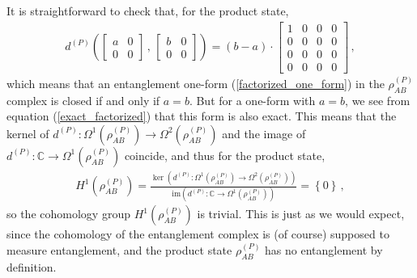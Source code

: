 \documentclass[12pt]{article}
\numberwithin{equation}{section}
\begin{document}
It is straightforward to check that, for the product state,
%
\begin{align}
    d^{(P)} \left( \begin{bmatrix} a & 0 \\ 0 & 0 \end{bmatrix} \, , \,  \begin{bmatrix} b & 0 \\ 0 & 0 \end{bmatrix} \right) = \left( b - a \right) \cdot \begin{bmatrix} 1 & 0 & 0 & 0 \\ 0 & 0 & 0 & 0 \\ 0 & 0 & 0 & 0 \\ 0 & 0 & 0 & 0 \end{bmatrix} \, ,
\end{align}
%
which means that an entanglement one-form (\ref{factorized_one_form}) in the $\rho^{(P)}_{AB}$ complex is closed if and only if $a = b$. But for a one-form with $a = b$, we see from equation (\ref{exact_factorized}) that this form is also exact. This means that the kernel of $d^{(P)} : \Omega^1 \left( \rho_{AB}^{(P)} \right) \to \Omega^2 \left( \rho_{AB}^{(P)} \right)$ and the image of $d^{(P)} : \mathbb{C} \to \Omega^1 \left( \rho_{AB}^{(P)} \right)$ coincide, and thus for the product state, 
%
\begin{align}
    H^1 \left( \rho_{AB}^{(P)} \right) = \frac{\ker \left( d^{(P)} : \Omega^1 \left( \rho_{AB}^{(P)} \right) \to \Omega^2 \left( \rho_{AB}^{(P)} \right) \right)}{\mathrm{im} \left( d^{(P)} : \mathbb{C} \to \Omega^1 \left( \rho_{AB}^{(P)} \right) \right) } = \left\{ 0 \right\} \, ,
\end{align}
%
so the cohomology group $H^1 \left( \rho_{AB}^{(P)} \right)$ is trivial. This is just as we would expect, since the cohomology of the entanglement complex is (of course) supposed to measure entanglement, and the product state $\rho_{AB}^{(P)}$ has no entanglement by definition.
\end{document}
